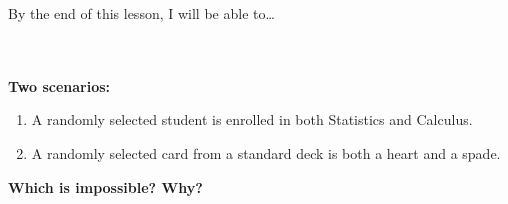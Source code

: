 \documentclass[10pt]{article}
\begin{document}
\namedateperiod

\vspace{0.12in}

\begin{objectivebox}
\small By the end of this lesson, I will be able to\dots\\[4pt]
\writeline\\[1pt]
\writeline\\[1pt]
\writeline
\end{objectivebox}

\vspace{0.1in}

\begin{vocabbox}
\end{vocabbox}

\vspace{0.1in}

\begin{hookbox}
\small
\textbf{Two scenarios:}
\begin{enumerate}[leftmargin=1.5em, itemsep=4pt]
  \item A randomly selected student is enrolled in both Statistics and Calculus.
  \item A randomly selected card from a standard deck is both a heart and a spade.
\end{enumerate}
\textbf{Which is impossible? Why?}\\[4pt]
\writeline\\[1pt]\writeline
\end{hookbox}

\vspace{0.1in}
\end{document}
